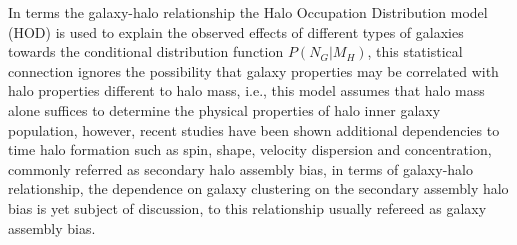 \documentclass[fleqn,usenatbib]{mnras}
\begin{document}
In terms the galaxy-halo relationship the Halo Occupation Distribution
model (HOD) is used to explain the observed effects of different types
of galaxies towards the conditional distribution function
$P(N_G|M_H)$, this statistical connection ignores the possibility that
galaxy properties may be correlated with halo properties different to
halo mass, i.e., this model assumes that halo mass alone suffices to
determine the physical properties of halo inner galaxy population,
however, recent studies have been shown additional dependencies to
time halo formation such as spin, shape, velocity dispersion and
concentration, commonly referred as secondary halo assembly bias, in
terms of galaxy-halo relationship, the dependence on galaxy clustering
on the secondary assembly halo bias is yet subject of discussion, to
this relationship usually refereed as galaxy assembly bias. 
\end{document}
